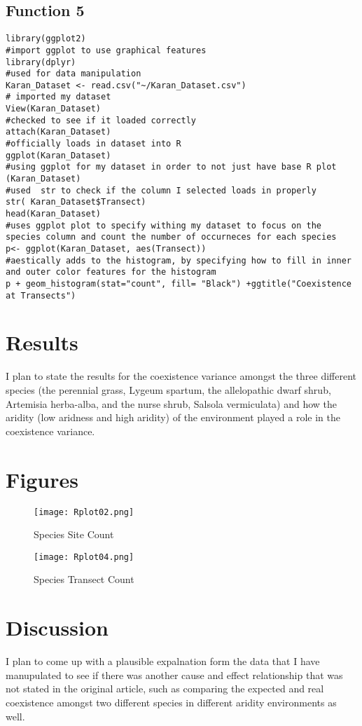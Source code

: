 \documentclass[letterpaper]{article}
\begin{document}
\subsection{Function 5}
\begin{verbatim}
library(ggplot2)
#import ggplot to use graphical features
library(dplyr)
#used for data manipulation
Karan_Dataset <- read.csv("~/Karan_Dataset.csv")
# imported my dataset
View(Karan_Dataset)
#checked to see if it loaded correctly
attach(Karan_Dataset)
#officially loads in dataset into R
ggplot(Karan_Dataset)
#using ggplot for my dataset in order to not just have base R plot
(Karan_Dataset)
#used  str to check if the column I selected loads in properly
str( Karan_Dataset$Transect)
head(Karan_Dataset)
#uses ggplot plot to specify withing my dataset to focus on the species column and count the number of occurneces for each species
p<- ggplot(Karan_Dataset, aes(Transect))
#aestically adds to the histogram, by specifying how to fill in inner and outer color features for the histogram
p + geom_histogram(stat="count", fill= "Black") +ggtitle("Coexistence at Transects")
\end{verbatim}

\section{Results}
I plan to state the results for the coexistence variance amongst the three different species (the perennial grass, Lygeum
spartum, the allelopathic dwarf shrub, Artemisia herba-alba, and the nurse shrub, Salsola vermiculata) and how the aridity (low aridness and high aridity)  of the environment played a role in the coexistence variance.

\newpage
\section{Figures}

\begin{figure}[h]
	\caption{Species Site  Count\label{fig: Plot}}
	\centering
	\texttt{[image: Rplot02.png]}
\end{figure} 

\newpage
\begin{figure}[h]
\caption{Species Transect Count\label{fig: Plot}}
	\centering
	\texttt{[image: Rplot04.png]}
\end{figure}


\newpage
\section{Discussion}
I plan to come up with a plausible expalnation form the data that I have manupulated to see if there was another cause and effect relationship that was not stated in the original article, such as comparing the expected and real coexistence amongst two different species in different aridity environments as well.
\end{document}
